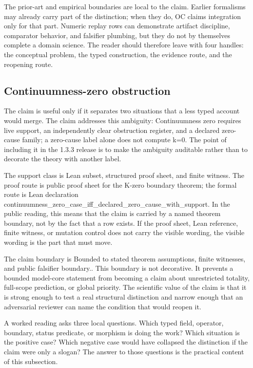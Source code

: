 The prior-art and empirical boundaries are local to the claim. Earlier formalisms may already carry part of the distinction; when they do, OC claims integration only for that part. Numeric replay rows can demonstrate artifact discipline, comparator behavior, and falsifier plumbing, but they do not by themselves complete a domain science. The reader should therefore leave with four handles: the conceptual problem, the typed construction, the evidence route, and the reopening route.

\subsection{Continuumness-zero obstruction}
The claim is useful only if it separates two situations that a less typed account would merge. The claim addresses this ambiguity: Continuumness zero requires live support, an independently clear obstruction register, and a declared zero-cause family; a zero-cause label alone does not compute k=0. The point of including it in the 1.3.3 release is to make the ambiguity auditable rather than to decorate the theory with another label.

The support class is Lean subset, structured proof sheet, and finite witness. The proof route is public proof sheet for the K-zero boundary theorem; the formal route is Lean declaration continuumness\_zero\_case\_iff\_declared\_zero\_cause\_with\_support. In the public reading, this means that the claim is carried by a named theorem boundary, not by the fact that a row exists. If the proof sheet, Lean reference, finite witness, or mutation control does not carry the visible wording, the visible wording is the part that must move.

The claim boundary is Bounded to stated theorem assumptions, finite witnesses, and public falsifier boundary.. This boundary is not decorative. It prevents a bounded model-core statement from becoming a claim about unrestricted totality, full-scope prediction, or global priority. The scientific value of the claim is that it is strong enough to test a real structural distinction and narrow enough that an adversarial reviewer can name the condition that would reopen it.

A worked reading asks three local questions. Which typed field, operator, boundary, status predicate, or morphism is doing the work? Which situation is the positive case? Which negative case would have collapsed the distinction if the claim were only a slogan? The answer to those questions is the practical content of this subsection.

